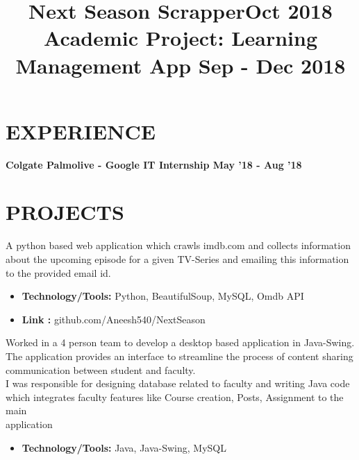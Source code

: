 \documentclass[margin]{res}
\begin{document}
\begin{resume}
\section{EXPERIENCE}

\textbf{Colgate Palmolive - Google IT Internship \hfill{May '18 - Aug '18}\\}

\section{PROJECTS}
\location{}
\title{\textbf{Next Season Scrapper\hfill Oct 2018}
 }
A python based web application which crawls imdb.com and collects information about the upcoming episode for a given TV-Series and emailing this information to the provided email id.  
\begin{itemize}
\item \textbf{Technology/Tools:} Python, BeautifulSoup, MySQL, Omdb API
\end{itemize}
\begin{itemize}
\item \textbf{Link :} github.com/Aneesh540/NextSeason
\end{itemize}

\location{}
\title{\textbf{Academic Project: Learning Management App \hfill Sep - Dec 2018}
 }
Worked in a 4 person team to develop a desktop based application in Java-Swing. The application provides an interface to streamline the process of content sharing communication between student and faculty.\\
I was responsible for designing database related to faculty and writing Java code which integrates faculty features like Course creation, Posts, Assignment to the main \\application
\begin{itemize}
\item \textbf{Technology/Tools:} Java, Java-Swing, MySQL 
\end{itemize}


\end{resume}
\end{document}

